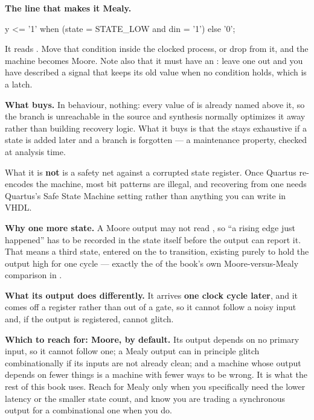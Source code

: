 \textbf{The line that makes it Mealy.}

\begin{vhdlcode}
y <= '1' when (state = STATE_LOW and din = '1') else '0';
\end{vhdlcode}

\noindent It reads . Move that condition inside the clocked process, or drop 
from it, and the machine becomes Moore. Note also that it must have an : leave one out
and you have described a signal that keeps its old value when no condition holds, which is a latch.

\textbf{What  buys.} In behaviour, nothing: every value of  is
already named above it, so the branch is unreachable in the source and synthesis normally optimizes
it away rather than building recovery logic. What it buys is that the  stays exhaustive
if a state is added later and a branch is forgotten --- a maintenance property, checked at analysis
time.

What it is \textbf{not} is a safety net against a corrupted state register. Once Quartus re-encodes
the machine, most bit patterns are illegal, and recovering from one needs Quartus's Safe State
Machine setting rather than anything you can write in VHDL. 

\textbf{Why one more state.} A Moore output may not read , so ``a rising edge just
happened'' has to be recorded in the state itself before the output can report it. That means a
third state, entered on the  to  transition, existing purely to hold the output high
for one cycle --- exactly the  of the book's own Moore-versus-Mealy comparison in
.

\textbf{What its output does differently.} It arrives \textbf{one clock cycle later}, and it comes
off a register rather than out of a gate, so it cannot follow a noisy input and, if the output is
registered, cannot glitch. 

\textbf{Which to reach for: Moore, by default.} Its output depends on no primary input, so it cannot
follow one; a Mealy output can in principle glitch combinationally if its inputs are not already
clean; and a machine whose output depends on fewer things is a machine with fewer ways to be wrong.
It is what the rest of this book uses. Reach for Mealy only when you specifically need the lower
latency or the smaller state count, and know you are trading a synchronous output for a
combinational one when you do. 

